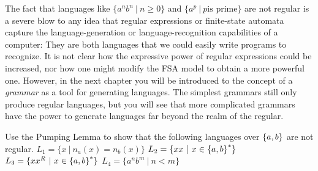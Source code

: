 \smallskip

The fact that languages like $\{a^nb^n\ | \ n \geq 0\}$ and $\{a^p \ |\ p \mbox{
is prime}\}$ are not regular is a severe blow to any idea that regular
expressions or finite-state automata capture the language-generation or
language-recognition capabilities of a computer: They are both languages that 
we could easily write programs to recognize.  It is not clear how the expressive
power of regular expressions could be increased, nor how one might modify the
FSA model to obtain a more powerful one.  However, 
in the next chapter you will be
introduced to the concept of a {\em grammar} as a tool for generating languages. 
The simplest grammars still only produce regular languages, but you will see
that more complicated grammars have the power to generate languages far beyond
the realm of the regular.

\begin{exercises}
\problem Use the Pumping Lemma to show that the following languages over $\mbox{$\{a,b\}$}$ 
are not regular.
\ppart $L_1 = \{ x \ | \ n_a(x) = n_b(x)\}$
\ppart $L_2 = \{ xx \ | \ x \in \mbox{$\{a,b\}$}^*\}$
\ppart $L_3 = \{ xx^R \ | \ x \in \mbox{$\{a,b\}$}^*\}$
\ppart $L_4 = \{ a^nb^m \ | \ n < m \}$

\end{exercises}




